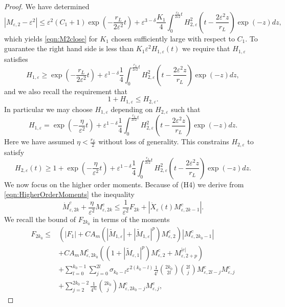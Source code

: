 \documentclass[]{article}
\theoremstyle{remark}
\begin{document}
\begin{proof}
We have determined
\[|M_{\varepsilon,2}-\varepsilon^2|\leq{}\varepsilon^2(C_1+1)\exp\left(-\frac{r_L}{2\varepsilon^2}t\right)+\varepsilon^{3-\delta}\frac{K_1}{4}\int_{0}^{\frac{r_L}{2\varepsilon 2}t}H_{2,\varepsilon}^2\left(t-\frac{2\varepsilon^2{z}}{r_L}\right)\exp\left(-z\right)dz,\]
which yields \eqref{eqn:M2close} for $K_1$ chosen sufficiently large with respect to $C_1$. To guarantee the right hand side is less than $K_1\varepsilon^2H_{1,\varepsilon}(t)$ we require that $H_{1,\varepsilon}$ satisfies \[H_{1,\varepsilon}\geq{}\exp\left(-\frac{r_L}{2\varepsilon^2}t\right)+\varepsilon^{1-\delta}\frac{1}{4}\int_{0}^{\frac{r_L}{2\varepsilon 2}t}H_{2,\varepsilon}^2\left(t-\frac{2\varepsilon^2{z}}{r_L}\right)\exp\left(-z\right)dz,\]
and we also recall the requirement that \[1+H_{1,\varepsilon}\leq{}H_{2,\varepsilon}.\]
In particular we may choose $H_{1,\varepsilon}$ depending on $H_{2,\varepsilon}$ such that 
\begin{equation}\label{eqn:H1Def}
H_{1,\varepsilon}=\exp\left(-\frac{\eta}{\varepsilon^2}t\right)+\varepsilon^{1-\delta}\frac{1}{4}\int_{0}^{\frac{r_L}{2\varepsilon 2}t}H_{2,\varepsilon}^2\left(t-\frac{2\varepsilon^2{z}}{r_L}\right)\exp\left(-z\right)dz.
\end{equation}
Here we have assumed $\eta<\frac{r_L}{2}$ without loss of generality. This constrains $H_{2,\varepsilon}$ to satisfy 
\begin{equation}\label{eqn:H2Bound1}
    H_{2,\varepsilon}(t)\geq{}1+\exp\left(-\frac{\eta}{\varepsilon^2}t\right)+\varepsilon^{1-\delta}\frac{1}{4}\int_{0}^{\frac{r_L}{2\varepsilon 2}t}H_{2,\varepsilon}^2\left(t-\frac{2\varepsilon^2{z}}{r_L}\right)\exp\left(-z\right)dz.
\end{equation}
We now focus on the higher order moments. 
Because of (H4) we derive from \eqref{eqn:HigherOrderMoments} the inequality
\begin{equation}\label{eqn:HigherOrderMoments2}
\dot{M}_{\varepsilon,2k}^c+\frac{\eta}{\varepsilon^2}{}M_{\varepsilon,2k}^c\leq{}\frac{1}{\varepsilon^2}F_{2k}+|\dot{X}_\varepsilon(t)M_{\varepsilon,2k-1}^{c}|.
\end{equation}
We recall the bound of $F_{2k_0}$ in terms of the moments
\begin{align*}
    F_{2k_0}\leq{}&(|F_1|+CA_m(|\widetilde{M}_{1,\varepsilon}|+|\widetilde{M}_{1,\varepsilon}|^p)M_{\varepsilon,2}^c)|M_{\varepsilon,2k_0-1}^c|\\
    &+CA_m{}M_{\varepsilon,2k_0}^c\left((1+|\widetilde{M}_{\varepsilon,1}|^p)M_{\varepsilon,2}^c+M_{\varepsilon,2+p}^{|c|}\right)\\
    &+\sum_{l=0}^{k_0-1}\sum_{j=0}^{2l}\sigma_{k_0-l}\varepsilon^{2(k_0-l)}\frac{1}{4^l}{2k_0\choose{2l}}{2l\choose{j}}M_{\varepsilon,2l-j}^c{}M_{\varepsilon,j}^c\\
    &+\sum_{j=2}^{2k_0-2}\frac{1}{4^{k_0}}{2k_0\choose{j}}M_{\varepsilon,2k_0-j}^c{}M_{\varepsilon,j}^c,
\end{align*}



\end{proof}
\end{document}
